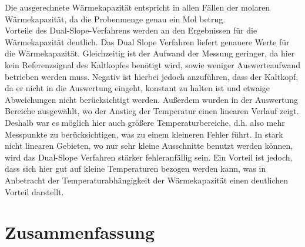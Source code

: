 \documentclass[parskip=half, a4paper,twoside,final]{article}
\begin{document}
Die ausgerechnete Wärmekapazität entspricht in allen Fällen der molaren Wärmekapazität, da die Probenmenge genau ein Mol betrug. \\
Vorteile des Dual-Slope-Verfahrens werden an den Ergebnissen für die Wärmekapazität deutlich. Das Dual Slope Verfahren liefert genauere Werte für die Wärmekapazität. Gleichzeitig ist der Aufwand der Messung geringer, da hier kein Referenzsignal des Kaltkopfes benötigt wird, sowie weniger Auswerteaufwand betrieben werden muss. Negativ ist hierbei jedoch anzuführen, dass der Kaltkopf, da er nicht in die Auswertung eingeht, konstant zu halten ist und etwaige Abweichungen nicht berücksichtigt werden. Außerdem wurden in der Auswertung Bereiche ausgewählt, wo der Anstieg der Temperatur einen linearen Verlauf zeigt. Deshalb war es möglich hier auch größere Temperaturbereiche, d.h. also mehr Messpunkte zu berücksichtigen, was zu einem kleineren Fehler führt. In stark nicht linearen Gebieten, wo nur sehr kleine Ausschnitte benutzt werden können, wird das Dual-Slope Verfahren stärker fehleranfällig sein. Ein Vorteil ist jedoch, dass sich hier gut auf kleine Temperaturen bezogen werden kann, was in Anbetracht der Temperaturabhängigkeit der Wärmekapazität einen deutlichen Vorteil darstellt.
\section{Zusammenfassung}


{}

\end{document}
